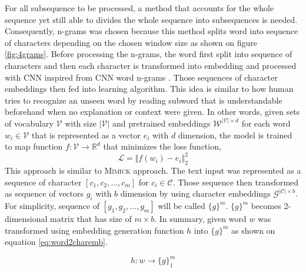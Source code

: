         For all subsequence to be processed, a method that accounts
        for the whole sequence yet still able to divides the whole
        sequence into subsequences is needed. Consequently, n-grams
        was chosen because this method splits word into sequence of
        characters depending on the chosen window size as shown on
        figure \ref{fig:4grams}. Before processing the n-grams, the
        word first split into sequence of characters and then each
        character is transformed into embedding and processed with CNN
        inspired from CNN word n-grams \citep{convolutional2014kim}.
        Those sequences of character embeddings then fed into learning
        algorithm. This idea is similar to how human tries to
        recognize an unseen word by reading subword that is
        understandable beforehand when no explanation or context were
        given. In other words, given sets of vocabulary $\mathcal{V}$
        with size $\vert\mathcal{V}\vert$ and pretrained embeddings
        $\mathcal{W}^{\vert\mathcal{V}\vert \times d}$ for each word
        $w_{i} \in \mathcal{V}$ that is represented as a vector $e_i$
        with $d$ dimension, the model is trained to map function
        $f:\mathcal{V} \rightarrow \mathbb{R}^d$ that minimizes the
        loss function,
        \begin{equation}
            \label{eq:lossfn}
            \mathcal{L} = \Vert f(w_i) - e_i \Vert^{2}_2
        \end{equation}
        This approach is similar to \textsc{Mimick}
        \cite{mimicking2017Pinter} approach. The text input was
        represented as a sequence of character $[c_1, c_2, \dots,
        c_m]$ for $c_i \in \mathcal{C}$. Those sequence then
        transformed as sequence of vectors $g_i$ with $b$ dimension by
        using character embeddings $\mathcal{G}^{\vert \mathcal{C}
        \vert \times b}$. For simplicity, sequence of $[g_1, g_2,
        \dots, g_m]$ will be called $\{g\}^m$. $\{g\}^m$ becomes
        2-dimensional matrix that has size of $m \times b$. In
        summary, given word $w$ was transformed using embedding
        generation function $h$ into $\{g\}^m$ as shown on equation
        \ref{eq:word2charemb}.

        \begin{equation}
            \label{eq:word2charemb}
            h: w \rightarrow \{g\}_1^m
        \end{equation}

